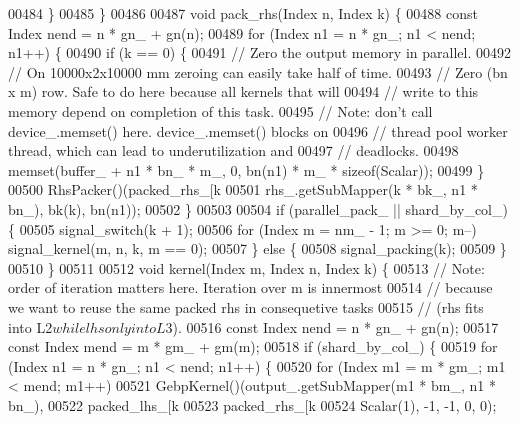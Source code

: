 \begin{DoxyCode}
00484       \}
00485     \}
00486 
00487     \textcolor{keywordtype}{void} pack\_rhs(Index n, Index k) \{
00488       \textcolor{keyword}{const} Index nend = n * gn\_ + gn(n);
00489       \textcolor{keywordflow}{for} (Index n1 = n * gn\_; n1 < nend; n1++) \{
00490         \textcolor{keywordflow}{if} (k == 0) \{
00491           \textcolor{comment}{// Zero the output memory in parallel.}
00492           \textcolor{comment}{// On 10000x2x10000 mm zeroing can easily take half of time.}
00493           \textcolor{comment}{// Zero (bn x m) row. Safe to do here because all kernels that will}
00494           \textcolor{comment}{// write to this memory depend on completion of this task.}
00495           \textcolor{comment}{// Note: don't call device\_.memset() here. device\_.memset() blocks on}
00496           \textcolor{comment}{// thread pool worker thread, which can lead to underutilization and}
00497           \textcolor{comment}{// deadlocks.}
00498           memset(buffer\_ + n1 * bn\_ * m\_, 0, bn(n1) * m\_ * \textcolor{keyword}{sizeof}(Scalar));
00499         \}
00500         RhsPacker()(packed\_rhs\_[k %
00501                     rhs\_.getSubMapper(k * bk\_, n1 * bn\_), bk(k), bn(n1));
00502       \}
00503 
00504       \textcolor{keywordflow}{if} (parallel\_pack\_ || shard\_by\_col\_) \{
00505         signal\_switch(k + 1);
00506         \textcolor{keywordflow}{for} (Index m = nm\_ - 1; m >= 0; m--) signal\_kernel(m, n, k, m == 0);
00507       \} \textcolor{keywordflow}{else} \{
00508         signal\_packing(k);
00509       \}
00510     \}
00511 
00512     \textcolor{keywordtype}{void} kernel(Index m, Index n, Index k) \{
00513       \textcolor{comment}{// Note: order of iteration matters here. Iteration over m is innermost}
00514       \textcolor{comment}{// because we want to reuse the same packed rhs in consequetive tasks}
00515       \textcolor{comment}{// (rhs fits into L2$ while lhs only into L3$).}
00516       \textcolor{keyword}{const} Index nend = n * gn\_ + gn(n);
00517       \textcolor{keyword}{const} Index mend = m * gm\_ + gm(m);
00518       \textcolor{keywordflow}{if} (shard\_by\_col\_) \{
00519         \textcolor{keywordflow}{for} (Index n1 = n * gn\_; n1 < nend; n1++) \{
00520           \textcolor{keywordflow}{for} (Index m1 = m * gm\_; m1 < mend; m1++)
00521             GebpKernel()(output\_.getSubMapper(m1 * bm\_, n1 * bn\_),
00522                          packed\_lhs\_[k %
00523                          packed\_rhs\_[k %
00524                          Scalar(1), -1, -1, 0, 0);

\end{DoxyCode}
